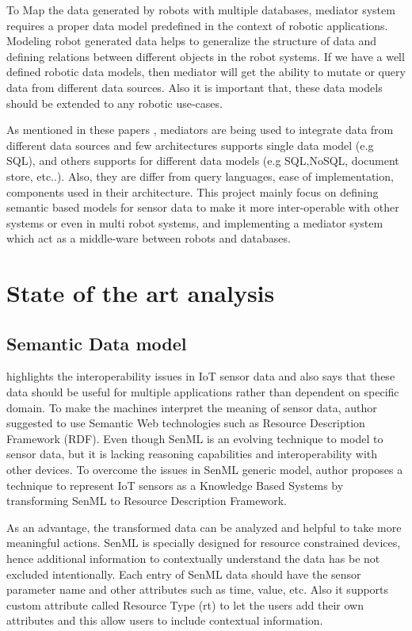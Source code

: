 \documentclass[12pt]{article}
\begin{document}
To Map the data generated by robots with multiple databases, mediator system requires a proper data model predefined in the context of robotic applications. Modeling robot generated data helps to generalize the structure of data and defining relations between different objects in the robot systems. If we have a well defined robotic data models, then mediator will get the ability to mutate or query data from different data sources. Also it is important that, these data models should be extended to any robotic use-cases.

As mentioned in these papers \cite{ahmed1991pegasus,fahl1993amos,arens1996query,chawathe1994tsimmis,chawathe1994tsimmis,shoens1993rufus}, mediators are being used to integrate data from different data sources and few architectures supports single data model (e.g SQL), and others supports for different data models (e.g SQL,NoSQL, document store, etc..). Also, they are differ from query languages, ease of implementation, components used in their architecture. This project mainly focus on defining semantic based models for sensor data to make it more inter-operable with other systems or even in multi robot systems, and implementing a mediator system which act as a middle-ware between robots and databases. 

\section{State of the art analysis}

\subsection{Semantic Data model}
\citet{su2014connecting} highlights the interoperability issues in IoT sensor data and also says that these data should be useful for multiple applications rather than dependent on specific domain. To make the machines interpret the meaning of sensor data, author suggested to use Semantic Web technologies such as Resource Description Framework (RDF). Even though SenML is an evolving technique to model to sensor data, but it is lacking reasoning capabilities and interoperability with other devices. To overcome the issues in SenML generic model, author proposes a technique to represent IoT sensors as a Knowledge Based Systems by transforming SenML to Resource Description Framework. 

As an advantage, the transformed data can be analyzed and helpful to take more meaningful actions. 
SenML is specially designed for resource constrained devices, hence additional information to contextually understand the data has be not excluded intentionally. Each entry of SenML data should have the sensor parameter name and other attributes such as time, value, etc. Also it supports custom attribute called Resource Type (rt) to let the users add their own attributes and this allow users to include contextual information.
\end{document}
